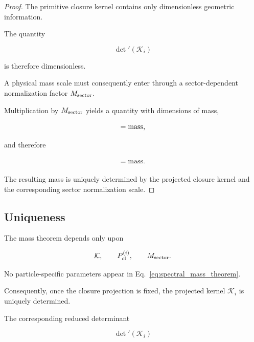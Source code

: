 \documentclass[11pt]{article}
\theoremstyle{definition}
\theoremstyle{remark}
\begin{document}
\begin{proof}

The primitive closure kernel contains only dimensionless
geometric information.

The quantity

\begin{equation}
\det{}'(\mathcal K_i)
\end{equation}

is therefore dimensionless.

A physical mass scale must consequently enter through a
sector-dependent normalization factor
\(M_{\rm sector}\).

Multiplication by \(M_{\rm sector}\) yields a quantity with
dimensions of mass,

\begin{equation}
[M_{\rm sector}] ={\rm mass},
\end{equation}

and therefore

\begin{equation}
[m_i] = 
{\rm mass}.
\end{equation}

The resulting mass is uniquely determined by the projected
closure kernel and the corresponding sector normalization
scale.

\end{proof}


\subsection{Uniqueness}
\label{subsec:mass_uniqueness}

The mass theorem depends only upon

\begin{equation}
\mathcal K,
\qquad
P_{\rm cl}^{(i)},
\qquad
M_{\rm sector}.
\end{equation}

No particle-specific parameters appear in
Eq.~\eqref{eq:spectral_mass_theorem}.

Consequently, once the closure projection is fixed, the
projected kernel \(\mathcal K_i\) is uniquely determined.

The corresponding reduced determinant

\begin{equation}
\det{}'(\mathcal K_i)
\end{equation}
\end{document}
